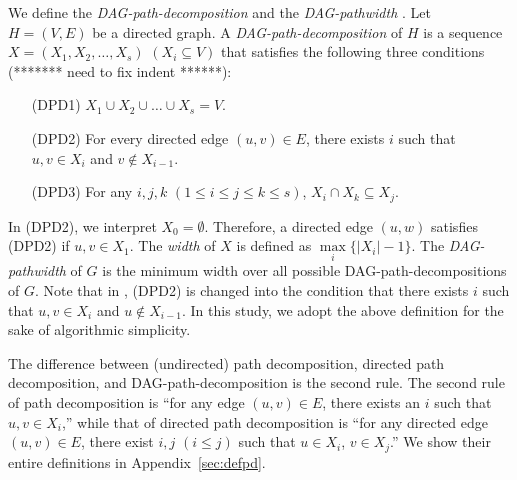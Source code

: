 \documentclass[runningheads]{llncs}
\theoremstyle{plain}
\theoremstyle{definition}
\begin{document}

We define the \emph{DAG-path-decomposition} and the \emph{DAG-pathwidth} \cite{art12}. Let $H = (V, E)$ be a directed graph. A \emph{DAG-path-decomposition} of $H$ is a sequence $X = (X_1, X_2, \dots, X_s)$ $(X_i \subseteq V)$ that satisfies the following three conditions (******* need to fix indent ******):
\begin{enumerate}
    \item[(DPD1)] $X_1 \cup X_2 \cup \dots \cup X_s = V$.
    \item[(DPD2)] For every directed edge $(u, v) \in E$, there exists $i$ such that $u, v \in X_i$ and $v \notin X_{i-1}$. \label{original_rule}
    \item[(DPD3)] For any $i, j, k$ $(1 \leq i \leq j \leq k \leq s)$, $X_i \cap X_k \subseteq X_j$. %
\end{enumerate}
In (DPD2), we interpret $X_0 = \emptyset$. Therefore, a directed edge $(u, w)$ satisfies (DPD2) if $u, v \in X_1$. The \emph{width} of $X$ is defined as $\underset{i}{\max} \{ |X_i| - 1 \}$. The \emph{DAG-pathwidth} of $G$ is the minimum width over all possible DAG-path-decompositions of $G$. Note that in \cite{art12}, (DPD2) is changed into the condition that there exists $i$ such that $u, v \in X_i$ and $u \notin X_{i-1}$. In this study, we adopt the above definition for the sake of algorithmic simplicity.


The difference between (undirected) path decomposition,
directed path decomposition, and DAG-path-decomposition is the second rule. The second rule of path decomposition is ``for any edge $(u, v) \in E$, there exists an $i$ such that $u, v \in X_i$,''  while that of directed path decomposition is ``for any directed edge $(u, v) \in E$, there exist $i, j$ $(i \leq j)$ such that $u \in X_i$, $v \in X_j$.'' We show their entire definitions in Appendix~\ref{sec:defpd}.
\end{document}
